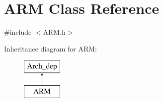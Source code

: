 \hypertarget{classARM}{}\section{A\+RM Class Reference}
\label{classARM}


{\ttfamily \#include $<$A\+R\+M.\+h$>$}

Inheritance diagram for A\+RM\+:\begin{figure}[H]
\begin{center}
\leavevmode
\includegraphics[height=2.000000cm]{classARM}
\end{center}
\end{figure}
